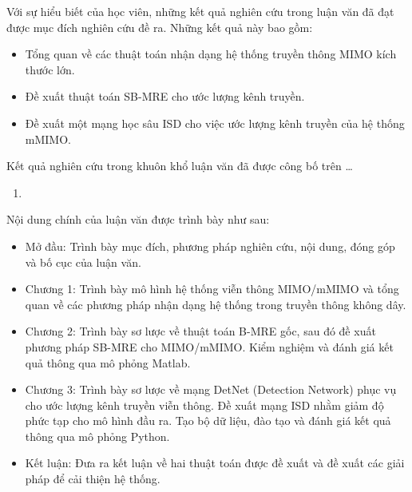 
Với sự hiểu biết của học viên, những kết quả nghiên cứu trong luận văn đã đạt được mục đích nghiên cứu đề ra. Những kết quả này bao gồm:

\renewcommand{\labelitemi}{$-$}
\begin{itemize}
	\item Tổng quan về các thuật toán nhận dạng hệ thống truyền thông MIMO kích thước lớn.
	\item Đề xuất thuật toán SB-MRE cho ước lượng kênh truyền.
	\item Đề xuất một mạng học sâu ISD cho việc ước lượng kênh truyền của hệ thống mMIMO.
\end{itemize} 

Kết quả nghiên cứu trong khuôn khổ luận văn đã được công bố trên \ldots
\begin{enumerate}
    \item 
\end{enumerate}

\vspace{0.5cm}

Nội dung chính của luận văn được trình bày như sau:

\renewcommand{\labelitemi}{$-$}
\begin{itemize}
	\item Mở đầu: Trình bày mục đích, phương pháp nghiên cứu, nội dung, đóng góp và bố cục của luận văn.
	\item Chương 1: Trình bày mô hình hệ thống viễn thông MIMO/mMIMO và tổng quan về các phương pháp nhận dạng hệ thống trong truyền thông không dây.
	\item Chương 2: Trình bày sơ lược về thuật toán B-MRE gốc, sau đó đề xuất phương pháp SB-MRE cho MIMO/mMIMO. Kiểm nghiệm và đánh giá kết quả thông qua mô phỏng Matlab.
	\item Chương 3: Trình bày sơ lược về mạng DetNet (Detection Network) phục vụ cho ước lượng kênh truyền viễn thông. Đề xuất mạng ISD nhằm giảm độ phức tạp cho mô hình đầu ra. Tạo bộ dữ liệu, đào tạo và đánh giá kết quả thông qua mô phỏng Python.
	\item Kết luận: Đưa ra kết luận về hai thuật toán được đề xuất và đề xuất các giải pháp để cải thiện hệ thống.
\end{itemize} 